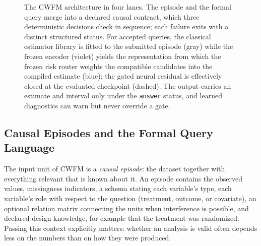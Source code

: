 \documentclass[electronics,article,submit,oneauthor]{Definitions/mdpi}
\begin{document}
\begin{figure}[!t]
\caption{The CWFM architecture in four lanes. The episode and the formal query merge into a declared causal contract, which three deterministic decisions check in sequence; each failure exits with a distinct structured status. For accepted queries, the classical estimator library is fitted to the submitted episode (gray) while the frozen encoder (violet) yields the representation from which the frozen risk router weights the compatible candidates into the compiled estimate (blue); the gated neural residual is effectively closed at the evaluated checkpoint (dashed). The output carries an estimate and interval only under the \texttt{answer} status, and learned diagnostics can warn but never override a gate.}
\label{fig:architecture}
\end{figure}


\subsection{Causal Episodes and the Formal Query Language}\label{sec:approach-episode}

The input unit of CWFM is a \emph{causal episode}: the dataset together with everything relevant that is known about it. An episode contains the observed values, missingness indicators, a schema stating each variable's type, each variable's role with respect to the question (treatment, outcome, or covariate), an optional relation matrix connecting the units when interference is possible, and declared design knowledge, for example that the treatment was randomized. Passing this context explicitly matters: whether an analysis is valid often depends less on the numbers than on how they were produced.
\end{document}
